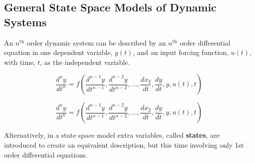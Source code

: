 \subsection*{General State Space Models of Dynamic Systems}

An $n^\mathrm{th}$ order dynamic system can be described by an $n^\mathrm{th}$ order differential equation in one dependent variable, $y(t)$, and an input forcing function, $u(t)$, with time, $t$, as the independent variable.

\begin{equation}
\frac{d^ny}{dt^n}=f\left(\frac{d^{n-1}y}{dt^{n-1}}, \frac{d^{n-2}y}{dt^{n-2}}, \ldots, \frac{dx_2}{dt}, \frac{dy}{dt}, y, u(t), t \right) \label{eq:l13e12}
\end{equation}
\ifslidesonly
\begin{slide}
	\begin{equation}
	\frac{d^ny}{dt^n}=f\left(\frac{d^{n-1}y}{dt^{n-1}}, \frac{d^{n-2}y}{dt^{n-2}}, \ldots, \frac{dx_2}{dt}, \frac{dy}{dt}, y, u(t), t \right) \nonumber
	\end{equation}
\end{slide}
\fi
Alternatively, in a state space model extra variables, called \textbf{states}, are introduced to create an equivalent description, but this time involving only 1st order differential equations.


